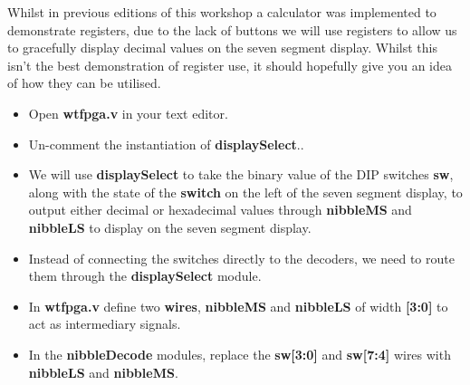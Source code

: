 \documentclass[12pt,a4paper]{article}
\begin{document}
\noindent
Whilst in previous editions of this workshop a calculator was implemented to demonstrate registers, due to the lack of buttons we will use registers to allow us to gracefully display decimal values on the seven segment display. Whilst this isn't the best demonstration of register use, it should hopefully give you an idea of how they can be utilised.

\begin{itemize}
	\item Open \textbf{wtfpga.v} in your text editor. 
	\item Un-comment the instantiation of \textbf{displaySelect}..
	\item We will use \textbf{displaySelect} to take the binary value of the DIP switches \textbf{sw}, along with the state of the \textbf{switch} on the left of the seven segment display, to output either decimal or hexadecimal values through \textbf{nibbleMS} and \textbf{nibbleLS} to display on the seven segment display. 
	\item Instead of connecting the switches directly to the decoders, we need to route them through the \textbf{displaySelect} module. 
	\item In \textbf{wtfpga.v} define two \textbf{wires}, \textbf{nibbleMS} and \textbf{nibbleLS} of width \textbf{[3:0]} to act as intermediary signals.
	\item In the \textbf{nibbleDecode} modules, replace the \textbf{sw[3:0]} and \textbf{sw[7:4]} wires with \textbf{nibbleLS} and \textbf{nibbleMS}.	
\end{itemize} 
\end{document}
